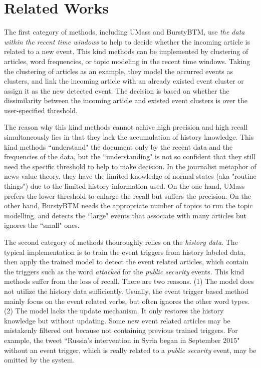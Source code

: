 \documentclass{article}
\begin{document}
\section{Related Works}
The first category of methods, including UMass\cite{Allan:2000wu} and BurstyBTM\cite{Yan:2015wm}, use \textit{the data within the recent time windows} to help to decide whether the incoming article is related to a new event. 
This kind methods can be implemented by clustering of articles\cite{Allan:2000wu}\cite{Petrovic:2010uj}\cite{Wurzer:2015wq}, word frequencies\cite{Mathioudakis:2010fc}\cite{Weng:2011wz}, or topic modeling\cite{Diao:2012wj}\cite{Yan:2015wm} in the recent time windows. 
Taking the clustering of articles as an example, they model the occurred events as clusters, and link the incoming article with an already existed event cluster or assign it as the new detected event.
The decision is based on whether the dissimilarity between the incoming article and existed event clusters is over the user-specified threshold. 

The reason why this kind methods cannot achive high precision and high recall simultaneously lies in that they lack the accumulation of history knowledge. 
This kind methods ``understand" the document only by the recent data and the frequencies of the data, but the ``understanding" is not so confident that they still need the specific threshold to help to make decision. In the journalist metaphor of news value theory, they have the limited knowledge of normal states (aka "routine things") due to the limited history information used. 
On the one hand, UMass\cite{Allan:2000wu} prefers the lower threshold to enlarge the recall but suffers the precision. 
On the other hand, BurstyBTM needs the appropriate number of topics to run the topic modelling, and detects the ``large" events that associate with many articles but ignores the ``small" ones. 

The second category of methods thouroughly relies on the \textit{history data}. 
The typical implementation is to train the event triggers\cite{Li2013JointEE}\cite{Nguyen2015EventDA} from history labeled data, then apply the trained model to detect the event related articles, which contain the triggers such as the word \textit{attacked} for the \textit{public security} events. 
This kind methods suffer from the loss of recall. 
There are two reasons. 
(1) The model does not utilize the history data sufficiently. 
Usually, the event trigger based method mainly focus on the event related verbs, but often ignores the other word types.
(2) The model lacks the update mechanism. 
It only restores the history knowledge but without updating. 
Some new event related articles may be mistakenly filtered out because not containing previous trained triggers. 
For example, the tweet ``Russia's intervention in Syria began in September 2015" without an event trigger, which is really related to a \textit{public security} event, may be omitted by the system. 
\end{document}
